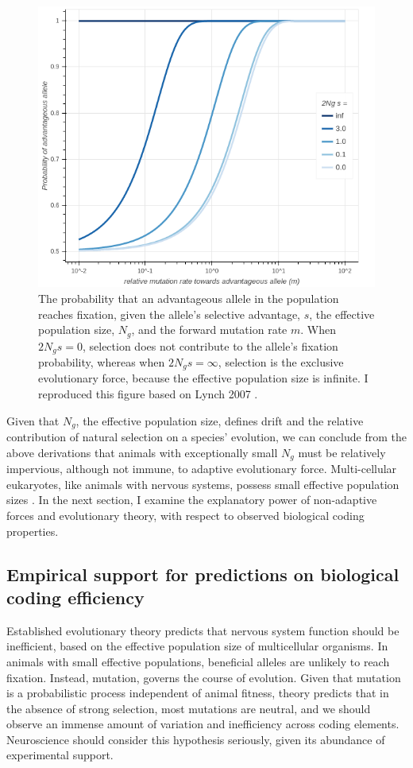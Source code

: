 \documentclass{article}
\begin{document}
\begin{figure}[htp]
\centering
\includegraphics[width=9.5 cm]{fig_1.png}
\caption{The probability that an advantageous allele in the population reaches fixation, given the allele's selective advantage, $s$, the effective population size, $N_g$, and the forward mutation rate $m$. When $2N_gs=0$, selection does not contribute to the allele's fixation probability, whereas when $2N_gs=\infty$, selection is the exclusive evolutionary force, because the effective population size is infinite. I reproduced this figure based on Lynch 2007 \cite{Lynch_2007}.}
\end{figure}

Given that $N_g$, the effective population size, defines drift and the relative contribution of natural selection on a species' evolution, we can conclude from the above derivations that animals with exceptionally small $N_g$ must be relatively impervious, although not immune, to adaptive evolutionary force. Multi-cellular eukaryotes, like animals with nervous systems, possess small effective population sizes \cite{Lynch_Conery_2003}. In the next section, I examine the explanatory power of non-adaptive forces and evolutionary theory, with respect to observed biological coding properties. 

\subsection{Empirical support for predictions on biological coding efficiency}

Established evolutionary theory predicts that nervous system function should be inefficient, based on the effective population size of multicellular organisms. In animals with small effective populations, beneficial alleles are unlikely to reach fixation. Instead, mutation, governs the course of evolution. Given that mutation is a probabilistic process independent of animal fitness, theory predicts that in the absence of strong selection, most mutations are neutral, and we should observe an immense amount of variation and inefficiency across coding elements. Neuroscience should consider this hypothesis seriously, given its abundance of experimental support. 
\end{document}
